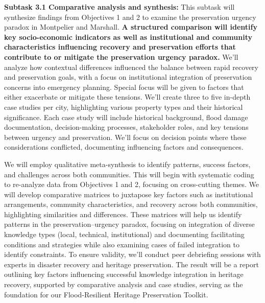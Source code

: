 \documentclass[11pt]{article}
\begin{document}
\textbf{Subtask 3.1 Comparative analysis and synthesis:}
This subtask will synthesize findings from Objectives 1 and 2 to examine the preservation urgency paradox in Montpelier and Marshall. 
\textbf{A structured comparison will identify key socio-economic indicators as well as institutional and community characteristics influencing recovery and preservation efforts that contribute to or mitigate the preservation urgency paradox.}
We’ll analyze how contextual differences influenced the balance between rapid recovery and preservation goals, with a focus on institutional integration of preservation concerns into emergency planning. 
Special focus will be given to factors that either exacerbate or mitigate these tensions. 
We’ll create three to five in-depth case studies per city, highlighting various property types and their historical significance. 
Each case study will include historical background, flood damage documentation, decision-making processes, stakeholder roles, and key tensions between urgency and preservation. 
We’ll focus on decision points where these considerations conflicted, documenting influencing factors and consequences.

We will employ qualitative meta-synthesis to identify patterns, success factors, and challenges across both communities. 
This will begin with systematic coding to re-analyze data from Objectives 1 and 2, focusing on cross-cutting themes.  
We will develop comparative matrices to juxtapose key factors such as institutional arrangements, community characteristics, and recovery across both communities, highlighting similarities and differences. 
These matrices will help us identify patterns in the preservation–urgency paradox, focusing on integration of diverse knowledge types (local, technical, institutional) and documenting facilitating conditions and strategies while also examining cases of failed integration to identify constraints.
To ensure validity, we’ll conduct peer debriefing sessions with experts in disaster recovery and heritage preservation. 
The result will be a report outlining key factors influencing successful knowledge integration in heritage recovery, supported by comparative analysis and case studies, serving as the foundation for our Flood-Resilient Heritage Preservation Toolkit.
\end{document}
